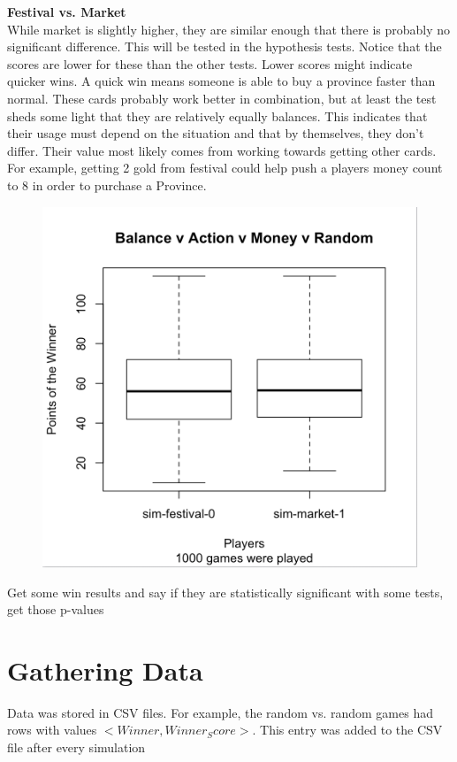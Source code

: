 \documentclass[11pt, oneside]{article}   	%
\begin{document}
\textbf{Festival vs. Market}\\

While market is slightly higher, they are similar enough that there is probably no significant difference. This will be tested in the hypothesis tests. Notice that the scores are lower for these than the other tests. Lower scores might indicate quicker wins. A quick win means someone is able to buy a province faster than normal. These cards probably work better in combination, but at least the test sheds some light that they are relatively equally balances. This indicates that their usage must depend on the situation and that by themselves, they don't differ. Their value most likely comes from working towards getting other cards. For example, getting 2 gold from festival could help push a players money count to 8 in order to purchase a Province.

\begin{figure}[H]
\includegraphics[width=.75\textwidth]{festival_market}
\centering
\end{figure}


Get some win results and say if they are statistically significant with some tests, get those p-values

\section{Gathering Data}

Data was stored in CSV files. For example, the random vs. random games had rows with values  $<Winner, Winner_Score>$. This entry was added to the CSV file after every simulation
\end{document}
